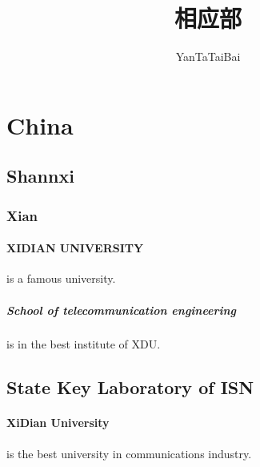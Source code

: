 \documentclass{ctexbook}
\title{相应部}                  %
\author{YanTaTaiBai}
\begin{document}
   \maketitle                               %
\tableofcontents                              %
   \section{China}                           %
     \subsection{Shannxi}                      %
       \subsubsection{Xian}                    %
         \paragraph{XIDIAN UNIVERSITY}is a famous university.  %
           \subparagraph{School of telecommunication engineering} is in the best institute of XDU.
       \subsection{State Key Laboratory of ISN }
         \paragraph{XiDian University} is the best university in communications industry.
\end{document}
